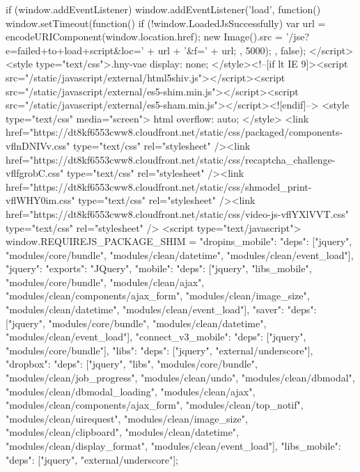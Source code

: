 {    if (window.addEventListener) {
        window.addEventListener('load', function() {
            window.setTimeout(function() {
                if (!window.LoadedJsSuccessfully) {
                    var url = encodeURIComponent(window.location.href);
                    new Image().src = '/jse?e=failed+to+load+script&loc=' + url + '&f=' + url;
                }
            }, 5000);
        }, false);
    }
</script><style type="text/css">.hny-vae { display: none; }</style><!--[if lt IE 9]><script src="/static/javascript/external/html5shiv.js"></script><script src="/static/javascript/external/es5-shim.min.js"></script><script src="/static/javascript/external/es5-sham.min.js"></script><![endif]-->  
            <style type="text/css" media="screen">
                html {
                  overflow: auto;
                }
            </style>
        <link href="https://dt8kf6553cww8.cloudfront.net/static/css/packaged/components-vflnDNIVv.css" type="text/css" rel="stylesheet" /><link href="https://dt8kf6553cww8.cloudfront.net/static/css/recaptcha_challenge-vflfgrobC.css" type="text/css" rel="stylesheet" /><link href="https://dt8kf6553cww8.cloudfront.net/static/css/shmodel_print-vflWHY0im.css" type="text/css" rel="stylesheet" /><link href="https://dt8kf6553cww8.cloudfront.net/static/css/video-js-vflYXlVVT.css" type="text/css" rel="stylesheet" /> <script type="text/javascript">
                        window.REQUIREJS_PACKAGE_SHIM = {"dropins_mobile": {"deps": ["jquery", "modules/core/bundle", "modules/clean/datetime", "modules/clean/event_load"]}, "jquery": {"exports": "JQuery"}, "mobile": {"deps": ["jquery", "libs_mobile", "modules/core/bundle", "modules/clean/ajax", "modules/clean/components/ajax_form", "modules/clean/image_size", "modules/clean/datetime", "modules/clean/event_load"]}, "saver": {"deps": ["jquery", "modules/core/bundle", "modules/clean/datetime", "modules/clean/event_load"]}, "connect_v3_mobile": {"deps": ["jquery", "modules/core/bundle"]}, "libs": {"deps": ["jquery", "external/underscore"]}, "dropbox": {"deps": ["jquery", "libs", "modules/core/bundle", "modules/clean/job_progress", "modules/clean/undo", "modules/clean/dbmodal", "modules/clean/dbmodal_loading", "modules/clean/ajax", "modules/clean/components/ajax_form", "modules/clean/top_notif", "modules/clean/uirequest", "modules/clean/image_size", "modules/clean/clipboard", "modules/clean/datetime", "modules/clean/display_format", "modules/clean/event_load"]}, "libs_mobile": {"deps": ["jquery", "external/underscore"]}};
}
